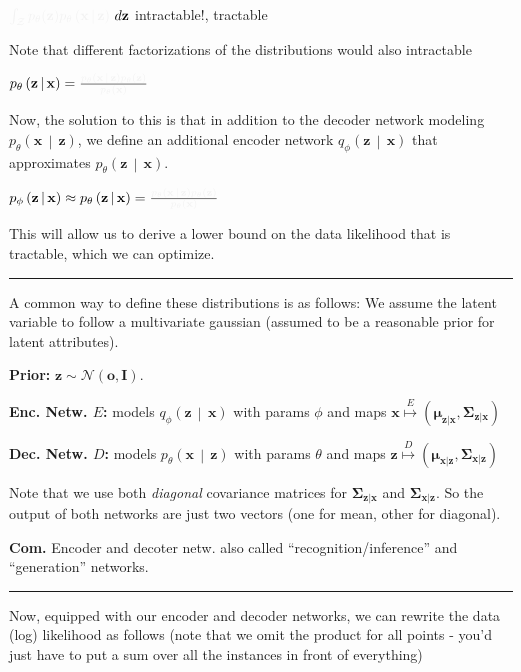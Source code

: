 \documentclass[a2paper,8pt]{extarticle}
\makeatletter
\newcommand{\tcr}[1]{\textcolor{lighttext}{#1}}
\newcommand{\tcg}[1]{\textcolor{lighttext}{#1}}
\newcommand{\tcr}[1]{\textcolor{red}{#1}}
\newcommand{\tcg}[1]{\textcolor{green}{#1}}
\def\mc#1#{\@mc{#1}}
\def\@mc#1#2#3{%
  \protect\leavevmode
  \begingroup
    \color#1{#2}#3%
  \endgroup
}
\newcommand{\mcr}[1]{\mc{lighttext}{#1}}
\newcommand{\mcg}[1]{\mc{lighttext}{#1}}
\newcommand{\mcr}[1]{\mc{red}{#1}}
\newcommand{\mcg}[1]{\mc{green}{#1}}
\newcommand{\cN}{\mathcal{N}}
\newcommand{\cZ}{\mathcal{Z}}
\newcommand{\Dist}[2]{#1\left( #2 \right)}
\newcommand{\cDist}[3]{#1\left( #2 \,\middle|\, #3 \right)}
\newcommand{\mat}[1]{\mathbf{#1}}
\renewcommand{\vec}[1]{\mathbf{#1}}
\newcommand{\vo}{\vec{o}}
\newcommand{\vx}{\vec{x}}
\newcommand{\vz}{\vec{z}}
\newcommand{\vmu}{\boldsymbol{\mu}}
\newcommand{\MI}{\mat{I}}
\newcommand{\MSigma}{\mat{\Sigma}}
\newcommand{\Com}{\textbf{Com.} }
\newcommand{\sep}{\vspace{0pt}\noindent\hrule\vspace{0pt}}
\newcommand{\sep}{\vspace{5pt}\noindent\hrule\vspace{5pt}}
\makeatother
\begin{document}
\begin{landscape}
\begin{multicols*}{7}
$\mcr{\int_{\cZ}} \mcg{p_\theta(\vz)}\mcg{\cDist{p_\theta}{\vx}{\vz}} \,d\vz$
\quad\tcr{intractable!}, \tcg{tractable}

Note that different factorizations of the distributions would also intractable

$\cDist{p_\theta}{\vz}{\vx}=\frac{\tcg{\cDist{p_\theta}{\vx}{\vz}
\Dist{p_\theta}{\vz}}}{\tcr{\Dist{p_\theta}{\vx}}}$

Now, the solution to this is that in addition to the decoder network modeling
$\cDist{p_\theta}{\vx}{\vz}$, we define an additional encoder network
$\cDist{q_\phi}{\vz}{\vx}$ that approximates $\cDist{p_\theta}{\vz}{\vx}$.

$
\cDist{p_\phi}{\vz}{\vx}
\approx
\cDist{p_\theta}{\vz}{\vx}=\frac{\tcg{\cDist{p_\theta}{\vx}{\vz}
\Dist{p_\theta}{\vz}}}{\tcr{\Dist{p_\theta}{\vx}}}
$

This will allow us to derive a lower bound on the data likelihood that is
tractable, which we can optimize.

\sep

A common way to define these distributions is as follows: We assume the latent
variable to follow a multivariate gaussian (assumed to be a reasonable prior for
latent attributes).

\textbf{Prior:} $\vz\sim\cN(\vo,\MI)$.

\textbf{Enc. Netw. $E$:} models $\cDist{q_\phi}{\vz}{\vx}$ with params
$\phi$ and maps $\vx\stackrel{E}{\mapsto}(\vmu_{\vz|\vx},\MSigma_{\vz|\vx})$

\textbf{Dec. Netw. $D$:} models $\cDist{p_\theta}{\vx}{\vz}$ with params
$\theta$ and maps $\vz\stackrel{D}{\mapsto}(\vmu_{\vx|\vz},\MSigma_{\vx|\vz})$

Note that we use both \emph{diagonal} covariance matrices for
$\MSigma_{\vz|\vx}$ and $\MSigma_{\vx|\vz}$. So the output of both networks are
just two vectors (one for mean, other for diagonal).

\Com Encoder and decoter netw. also called ``recognition/inference'' and
``generation'' networks.

\sep

Now, equipped with our encoder and decoder networks, we can rewrite the data
(log) likelihood as follows (note that we omit the product for all points -
you'd just have to put a sum over all the instances in front of everything)


\end{multicols*}
\end{landscape}
\end{document}
